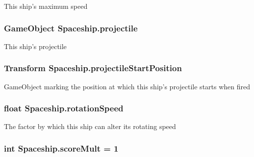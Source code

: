 This ship's maximum speed 

\hypertarget{class_spaceship_aa7814313026fe06a08a7d799e6830b28}{
\subsubsection[{projectile}]{\setlength{\rightskip}{0pt plus 5cm}Game\-Object Spaceship.\-projectile\hspace{0.3cm}{\ttfamily [protected]}}}\label{class_spaceship_aa7814313026fe06a08a7d799e6830b28}


This ship's projectile 

\hypertarget{class_spaceship_a842c5e6d86de86ffadd4175309855bfb}{
\subsubsection[{projectile\-Start\-Position}]{\setlength{\rightskip}{0pt plus 5cm}Transform Spaceship.\-projectile\-Start\-Position\hspace{0.3cm}{\ttfamily [protected]}}}\label{class_spaceship_a842c5e6d86de86ffadd4175309855bfb}


Game\-Object marking the position at which this ship's projectile starts when fired 

\hypertarget{class_spaceship_ad30837a682fd018a634b8310a121b7b4}{
\subsubsection[{rotation\-Speed}]{\setlength{\rightskip}{0pt plus 5cm}float Spaceship.\-rotation\-Speed\hspace{0.3cm}{\ttfamily [protected]}}}\label{class_spaceship_ad30837a682fd018a634b8310a121b7b4}


The factor by which this ship can alter its rotating speed 

\hypertarget{class_spaceship_a0ff708552628020c926e4aeb70c97654}{
\subsubsection[{score\-Mult}]{\setlength{\rightskip}{0pt plus 5cm}int Spaceship.\-score\-Mult = 1\hspace{0.3cm}{\ttfamily [protected]}}}\label{class_spaceship_a0ff708552628020c926e4aeb70c97654}


